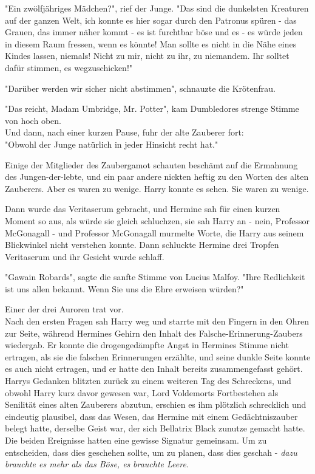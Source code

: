 {"Ein zwölfjähriges Mädchen?", rief der Junge. "Das sind die dunkelsten Kreaturen auf der ganzen Welt, ich konnte es hier sogar durch den Patronus spüren - das Grauen, das immer näher kommt - es ist furchtbar böse und es - es würde jeden in diesem Raum fressen, wenn es könnte! Man sollte es nicht in die Nähe eines Kindes lassen, niemals! Nicht zu mir, nicht zu ihr, zu niemandem. Ihr solltet dafür stimmen, es wegzuschicken!"

"Darüber werden wir sicher nicht abstimmen", schnauzte die Krötenfrau.

"Das reicht, Madam Umbridge, Mr. Potter", kam Dumbledores strenge Stimme von hoch oben.\\ Und dann, nach einer kurzen Pause, fuhr der alte Zauberer fort:\\ "Obwohl der Junge natürlich in jeder Hinsicht recht hat."

Einige der Mitglieder des Zaubergamot schauten beschämt auf die Ermahnung des Jungen-der-lebte, und ein paar andere nickten heftig zu den Worten des alten Zauberers. Aber es waren zu wenige. Harry konnte es sehen. Sie waren zu wenige.

Dann wurde das Veritaserum gebracht, und Hermine sah für einen kurzen Moment so aus, als würde sie gleich schluchzen, sie sah Harry an - nein, Professor McGonagall - und Professor McGonagall murmelte Worte, die Harry aus seinem Blickwinkel nicht verstehen konnte. Dann schluckte Hermine drei Tropfen Veritaserum und ihr Gesicht wurde schlaff.

"Gawain Robards", sagte die sanfte Stimme von Lucius Malfoy. "Ihre Redlichkeit ist uns allen bekannt. Wenn Sie uns die Ehre erweisen würden?"

Einer der drei Auroren trat vor.\\ Nach den ersten Fragen sah Harry weg und starrte mit den Fingern in den Ohren zur Seite, während Hermines Gehirn den Inhalt des Falsche-Erinnerung-Zaubers wiedergab. Er konnte die drogengedämpfte Angst in Hermines Stimme nicht ertragen, als sie die falschen Erinnerungen erzählte, und seine dunkle Seite konnte es auch nicht ertragen, und er hatte den Inhalt bereits zusammengefasst gehört. Harrys Gedanken blitzten zurück zu einem weiteren Tag des Schreckens, und obwohl Harry kurz davor gewesen war, Lord Voldemorts Fortbestehen als Senilität eines alten Zauberers abzutun, erschien es ihm plötzlich schrecklich und eindeutig plausibel, dass das Wesen, das Hermine mit einem Gedächtniszauber belegt hatte, derselbe Geist war, der sich Bellatrix Black zunutze gemacht hatte. Die beiden Ereignisse hatten eine gewisse Signatur gemeinsam. Um zu entscheiden, dass dies geschehen sollte, um zu planen, dass dies geschah - \emph{dazu brauchte es mehr als das Böse, es} \emph{brauchte Leere.}

}
